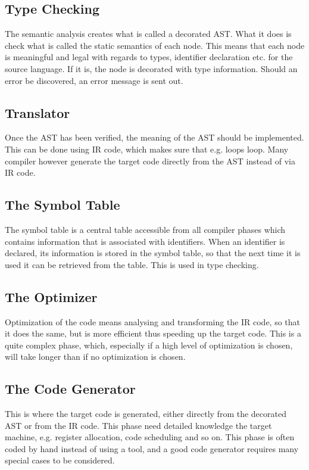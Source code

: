 \subsection{Type Checking}

The semantic analysis creates what is called a decorated AST. What it does is check what is called the static semantics of each node. This means that each node is meaningful and legal with regards to types, identifier declaration etc. for the source language. If it is, the node is decorated with  type information. Should an error be discovered, an error message is sent out.

\subsection{Translator}

Once the AST has been verified, the meaning of the AST should be implemented. This can be done using IR code, which makes sure that e.g. loops loop. Many compiler however generate the target code directly from the AST instead of via IR code.

\subsection{The Symbol Table}

The symbol table is a central table accessible from all compiler phases which contains information that is associated with identifiers. When an identifier is declared, its information is stored in the symbol table, so that the next time it is used it can be retrieved from the table. This is used in type checking.

\subsection{The Optimizer}

Optimization of the code means analysing and transforming the IR code, so that it does the same, but is more efficient thus speeding up the target code. This is a quite complex phase, which, especially if a high level of optimization is chosen, will take longer than if no optimization is chosen.

\subsection{The Code Generator}
This is where the target code is generated, either directly from the decorated AST or from the IR code. This phase need detailed knowledge the target machine, e.g. register allocation, code scheduling and so on. This phase is often coded by hand instead of using a tool, and a good code generator requires many special cases to be considered.